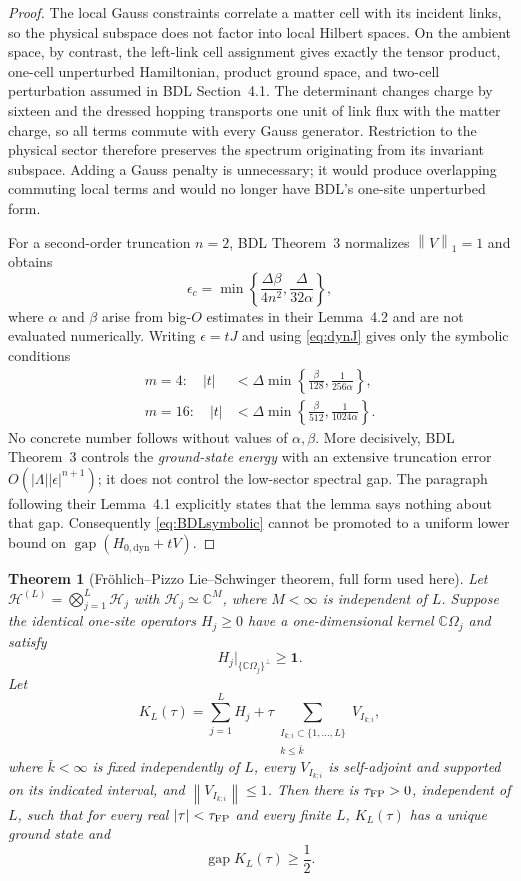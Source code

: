 \documentclass[11pt]{article}
\newtheorem{theorem}{Theorem}[section]
\theoremstyle{remark}
\newcommand{\Hh}{\mathcal H}
\newcommand{\C}{\mathbb C}
\newcommand{\id}{\mathbf 1}
\newcommand{\gap}{\operatorname{gap}}
\newcommand{\norm}[1]{\left\lVert #1\right\rVert}
\begin{document}
\begin{proof}
The local Gauss constraints correlate a matter cell with its incident
links, so the physical subspace does not factor into local Hilbert spaces.
On the ambient space, by contrast, the left-link cell assignment gives
exactly the tensor product, one-cell unperturbed Hamiltonian, product
ground space, and two-cell perturbation assumed in BDL Section~4.1.
The determinant changes charge by sixteen and the dressed hopping
transports one unit of link flux with the matter charge, so all terms
commute with every Gauss generator.  Restriction to the physical sector
therefore preserves the spectrum originating from its invariant
subspace.  Adding a Gauss penalty is unnecessary; it would produce
overlapping commuting local terms and would no longer have BDL's
one-site unperturbed form.

For a second-order truncation $n=2$, BDL Theorem~3 normalizes
$\norm{V}_1=1$ and obtains
\[
 \epsilon_c
 =\min\left\{\frac{\Delta\beta}{4n^2},
              \frac{\Delta}{32\alpha}\right\},
\tag{5.6}\label{eq:BDLeps}
\]
where $\alpha$ and $\beta$ arise from big-$O$ estimates in their
Lemma~4.2 and are not evaluated numerically.  Writing
$\epsilon=tJ$ and using \eqref{eq:dynJ} gives only the symbolic
conditions
\[
\begin{aligned}
 m=4:\quad
 |t|&<\Delta\min\left\{\frac{\beta}{128},
                  \frac1{256\alpha}\right\},\\
 m=16:\quad
 |t|&<\Delta\min\left\{\frac{\beta}{512},
                  \frac1{1024\alpha}\right\}.
\end{aligned}
\tag{5.7}\label{eq:BDLsymbolic}
\]
No concrete number follows without values of $\alpha,\beta$.
More decisively, BDL Theorem~3 controls the \emph{ground-state energy}
with an extensive truncation error
$O(|\Lambda||\epsilon|^{n+1})$; it does not control the low-sector
spectral gap.  The paragraph following their Lemma~4.1 explicitly states
that the lemma says nothing about that gap.  Consequently
\eqref{eq:BDLsymbolic} cannot be promoted to a uniform lower bound on
$\gap(H_{0,\mathrm{dyn}}+tV)$.
\end{proof}

\begin{theorem}[Fröhlich--Pizzo Lie--Schwinger theorem, full form used
here]
\label{thm:FP}
Let
$\Hh^{(L)}=\bigotimes_{j=1}^{L}\Hh_j$ with
$\Hh_j\simeq\C^M$, where $M<\infty$ is independent of $L$.
Suppose the identical one-site operators $H_j\geq0$ have a
one-dimensional kernel $\C\Omega_j$ and satisfy
\[
 H_j|_{\{\C\Omega_j\}^{\perp}}\geq\id.
\tag{5.8}\label{eq:FPlocal}
\]
Let
\[
 K_L(\tau)=\sum_{j=1}^{L}H_j+
 \tau\sum_{\substack{I_{k;i}\subset\{1,\ldots,L\}\\
                     k\leq\bar k}}V_{I_{k;i}},
\tag{5.9}\label{eq:FPK}
\]
where $\bar k<\infty$ is fixed independently of $L$, every
$V_{I_{k;i}}$ is self-adjoint and supported on its indicated interval,
and $\norm{V_{I_{k;i}}}\leq1$.  Then there is
$\tau_{\rm FP}>0$, independent of $L$, such that for every real
$|\tau|<\tau_{\rm FP}$ and every finite $L$, $K_L(\tau)$ has a unique
ground state and
\[
 \gap K_L(\tau)\geq\frac12.
\tag{5.10}\label{eq:FPgap}
\]
\end{theorem}
\end{document}
